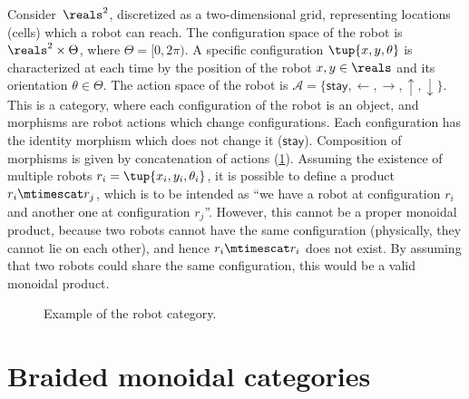 \begin{example}
    \label{ex:robot}
    Consider~$\reals^2$, discretized as a two-dimensional grid, representing locations (cells) which a robot can reach. The configuration space of the robot is $\reals^2\times \Theta$, where $\Theta=[0,2\pi)$. A specific configuration $\tup{x,y,\theta}$ is characterized at each time by the position of the robot $x,y\in \reals$ and its orientation $\theta \in \Theta$. The action space of the robot is $\mathcal{A}=\{\mathsf{stay},\leftarrow, \rightarrow, \uparrow, \downarrow\}$. This is a category, where each configuration of the robot is an object, and morphisms are robot actions which change configurations. Each configuration has the identity morphism which does not change it ($\mathsf{stay}$). Composition of morphisms is given by concatenation of actions (\cref{fig:robotcategory}). Assuming the existence of multiple robots $r_i=\tup{x_i,y_i,\theta_i}$, it is possible to define a product $r_i\mtimescat r_j$, which is to be intended as ``we have a robot at configuration $r_i$ and another one at configuration $r_j$''. However, this cannot be a proper monoidal product, because two robots cannot have the same configuration (physically, they cannot lie on each other), and hence $r_i\mtimescat r_i$ does not exist. By assuming that two robots could share the same configuration, this would be a valid monoidal product.
    \begin{figure}[tbh]
        \centering
        \caption{Example of the robot category. }
        \label{fig:robotcategory}
    \end{figure}
\end{example}


\section{Braided monoidal categories}


